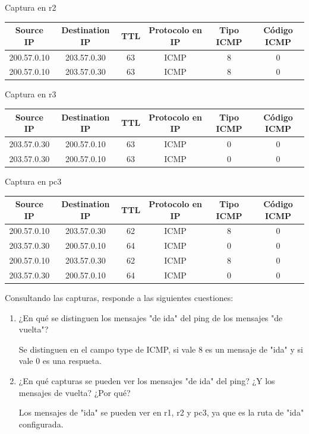 \documentclass[12pt, a4paper]{report}
\begin{document}
\begin{enumerate}
	Captura en r2
	
	\begin{tabular}{|c|c|c|c|c|c|}
		\hline
		Source IP & Destination IP & TTL & Protocolo en IP & Tipo ICMP & Código ICMP \\
		\hline
		200.57.0.10 & 203.57.0.30 & 63 & ICMP & 8 & 0 \\
		\hline 
		200.57.0.10 & 203.57.0.30 & 63 & ICMP & 8 & 0 \\
		\hline
	\end{tabular}

	Captura en r3
	
	\begin{tabular}{|c|c|c|c|c|c|}
		\hline
		Source IP & Destination IP & TTL & Protocolo en IP & Tipo ICMP & Código ICMP \\
		\hline
		203.57.0.30 & 200.57.0.10 & 63 & ICMP & 0 & 0 \\
		\hline 
		203.57.0.30 & 200.57.0.10 & 63 & ICMP & 0 & 0 \\
		\hline
	\end{tabular}

	Captura en pc3
	
	\begin{tabular}{|c|c|c|c|c|c|}
		\hline
		Source IP & Destination IP & TTL & Protocolo en IP & Tipo ICMP & Código ICMP \\
		\hline
		200.57.0.10 & 203.57.0.30 & 62 & ICMP & 8 & 0 \\
		\hline 
		203.57.0.30 & 200.57.0.10 & 64 & ICMP & 0 & 0 \\
		\hline
		200.57.0.10 & 203.57.0.30 & 62 & ICMP & 8 & 0 \\
		\hline 
		203.57.0.30 & 200.57.0.10 & 64 & ICMP & 0 & 0 \\
		\hline
	\end{tabular}

	Consultando las capturas, responde a las siguientes cuestiones:
	\begin{enumerate}[label=\alph*]
		\item ¿En qué se distinguen los mensajes "de ida" del ping de los mensajes "de vuelta"?
		
		Se distinguen en el campo type de ICMP, si vale 8 es un mensaje de "ida" y si vale 0 es una respueta.
		\item ¿En qué capturas se pueden ver los mensajes "de ida" del ping? ¿Y los mensajes de vuelta? ¿Por qué?
		
		Los mensajes de "ida" se pueden ver en r1, r2 y pc3, ya que es la ruta de "ida" configurada.
		

\end{enumerate}
\end{enumerate}
\end{document}

